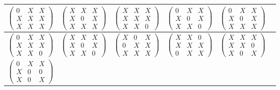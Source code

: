 \documentclass[nofootinbib,showpacs]{revtex4}
\begin{document}
\begin{table}
\begin{center}
\begin{tabular}{|l|l|l|l|l|l|}
\hline
$\left(\begin{array}{ccc}0&X&X\\X&X&X\\X&X&X\end{array}\right)$&
$\left(\begin{array}{ccc}X&X&X\\X&0&X\\X&X&X\end{array}\right)$&
$\left(\begin{array}{ccc}X&X&X\\X&X&X\\X&X&0\end{array}\right)$&
$\left(\begin{array}{ccc}0&X&X\\X&0&X\\X&X&0\end{array}\right)$&
$\left(\begin{array}{ccc}0&X&X\\X&0&X\\X&X&X\end{array}\right)$
\\
\hline
$\left(\begin{array}{ccc}0&X&X\\X&X&X\\X&X&0\end{array}\right)$&
$\left(\begin{array}{ccc}X&X&X\\X&0&X\\X&X&0\end{array}\right)$&
$\left(\begin{array}{ccc}X&0&X\\0&X&X\\X&X&X\end{array}\right)$&
$\left(\begin{array}{ccc}X&X&0\\X&X&X\\0&X&X\end{array}\right)$&
$\left(\begin{array}{ccc}X&X&X\\X&X&0\\X&0&X\end{array}\right)$
\\
\hline
$\left(\begin{array}{ccc}0&X&X\\X&0&0\\X&0&X\end{array}\right)$&

\end{tabular}
\end{center}
\end{table}
\end{document}
